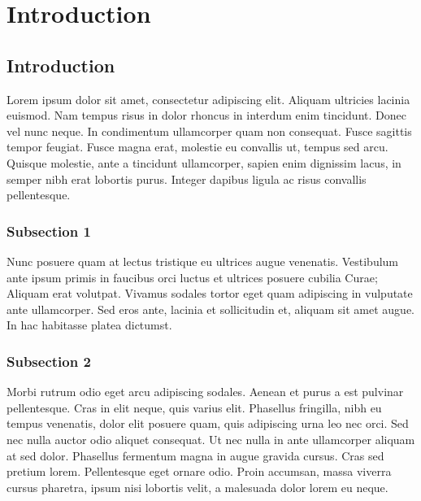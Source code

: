 
\chapter{Introduction} %

\label{ChapterIntroduction} %


\section{Introduction}

Lorem ipsum dolor sit amet, consectetur adipiscing elit. Aliquam ultricies lacinia euismod. Nam tempus risus in dolor rhoncus in interdum enim tincidunt. Donec vel nunc neque. In condimentum ullamcorper quam non consequat. Fusce sagittis tempor feugiat. Fusce magna erat, molestie eu convallis ut, tempus sed arcu. Quisque molestie, ante a tincidunt ullamcorper, sapien enim dignissim lacus, in semper nibh erat lobortis purus. Integer dapibus ligula ac risus convallis pellentesque.   

\subsection{Subsection 1}

Nunc posuere quam at lectus tristique eu ultrices augue venenatis. Vestibulum ante ipsum primis in faucibus orci luctus et ultrices posuere cubilia Curae; Aliquam erat volutpat. Vivamus sodales tortor eget quam adipiscing in vulputate ante ullamcorper. Sed eros ante, lacinia et sollicitudin et, aliquam sit amet augue. In hac habitasse platea dictumst.


\subsection{Subsection 2}
Morbi rutrum odio eget arcu adipiscing sodales. Aenean et purus a est pulvinar pellentesque. Cras in elit neque, quis varius elit. Phasellus fringilla, nibh eu tempus venenatis, dolor elit posuere quam, quis adipiscing urna leo nec orci. Sed nec nulla auctor odio aliquet consequat. Ut nec nulla in ante ullamcorper aliquam at sed dolor. Phasellus fermentum magna in augue gravida cursus. Cras sed pretium lorem. Pellentesque eget ornare odio. Proin accumsan, massa viverra cursus pharetra, ipsum nisi lobortis velit, a malesuada dolor lorem eu neque.

